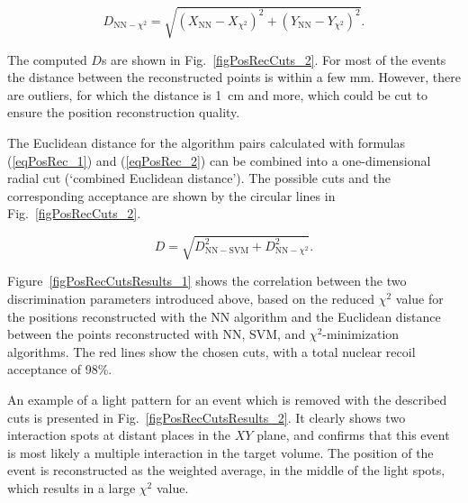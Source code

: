 \begin{equation}
\label{eqPosRec_2}
D_{\mathrm{NN}-\chi^{2}} = \sqrt{(X_{\mathrm{NN}}-X_{\chi^{2}})^{2} + (Y_{\mathrm{NN}}-Y_{\chi^{2}})^{2}}.
\end{equation}

The computed $D$s are shown in Fig.~\ref{figPosRecCuts_2}. For most of the events the distance between the reconstructed points is within a few mm. However, there are outliers, for which the distance is 1~cm and more, which could be cut to ensure the position reconstruction quality.

The Euclidean distance for the algorithm pairs calculated with formulas (\ref{eqPosRec_1}) and (\ref{eqPosRec_2}) can be combined into a one-dimensional radial cut (`combined Euclidean distance'). The possible cuts and the corresponding acceptance are shown by the circular lines in Fig.~\ref{figPosRecCuts_2}.

\begin{equation}
D = \sqrt{D_{\mathrm{NN}-\mathrm{SVM}}^{2} + D_{\mathrm{NN}-\chi^2}^{2}}.
\end{equation}

Figure~\ref{figPosRecCutsResults_1} shows the correlation between the two discrimination parameters introduced above, based on the reduced $\chi^{2}$ value for the positions reconstructed with the NN algorithm and the Euclidean distance between the points reconstructed with NN, SVM, and $\chi^{2}$-minimization algorithms. 
The red lines show the chosen cuts, with a total nuclear recoil acceptance of 98\%. 

An example of a light pattern for an event which is removed with the described cuts is presented in Fig.~\ref{figPosRecCutsResults_2}. It clearly shows two interaction spots at distant places in the $XY$ plane, and confirms that this event is most likely a multiple interaction in the target volume. The position of the event is reconstructed as the weighted average, in the middle of the light spots, which results in a large $\chi^{2}$ value.

